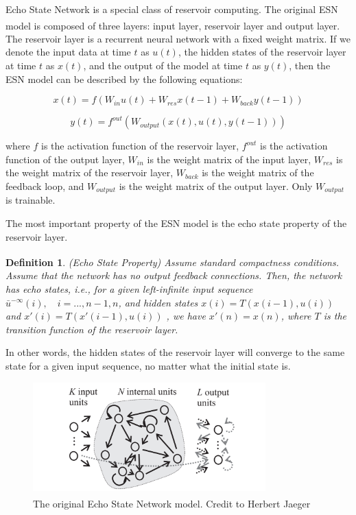 \documentclass{article}
\newcommand{\upcite}[1]{\textsuperscript{\cite{#1}}} %
\newtheorem{definition}[theorem]{Definition}
\begin{document}
Echo State Network is a special class of reservoir computing. The original ESN model\upcite{ESN} is composed of three layers:
input layer, reservoir layer and output layer. The reservoir layer is a recurrent neural network with a fixed weight matrix. 
If we denote the input data at time $t$ as $u(t)$, the hidden states of the reservoir layer at time $t$ as $x(t)$, and the 
output of the model at time $t$ as $y(t)$, then the ESN model can be described by the following equations:

\begin{equation}
    x(t) = f(W_{in}u(t) + W_{res}x(t-1) + W_{back}y(t-1))
\end{equation}

\begin{equation}
    y(t) = f^{out}(W_{output}(x(t), u(t), y(t-1)))
\end{equation}

where $f$ is the activation function of the reservoir layer, $f^{out}$ is the activation function of the output layer,
$W_{in}$ is the weight matrix of the input layer, $W_{res}$ is the weight matrix of the reservoir layer, $W_{back}$ is the weight matrix
of the feedback loop, and $W_{output}$ is the weight matrix of the output layer. Only $W_{output}$ is trainable.


The most important property of the ESN model is the echo state property of the reservoir layer.

\begin{definition}
    (Echo State Property\upcite{ESN}) Assume standard compactness conditions. Assume that the
    network has no output feedback connections. Then, the network has echo
    states, i.e., for a given left-infinite input sequence $\bar u^{-\infty}(i), \quad i=...,n-1,n$, and hidden 
    states $x(i) = T(x(i-1), u(i))$ and $x'(i) = T(x'(i-1), u(i))$ , we have $x'(n) = x(n)$, where $T$ is the
    transition function of the reservoir layer.
\end{definition}

In other words, the hidden states of the reservoir layer will converge to the same state for a given input sequence, no matter what the initial state is.

\begin{figure}[htbp]
    \centering
    \includegraphics[width=0.8\textwidth]{assets/esn.png}
    \caption{The original Echo State Network model. Credit to Herbert Jaeger\upcite{ESN}}
    \label{fig:esn_original}
\end{figure}
\end{document}
